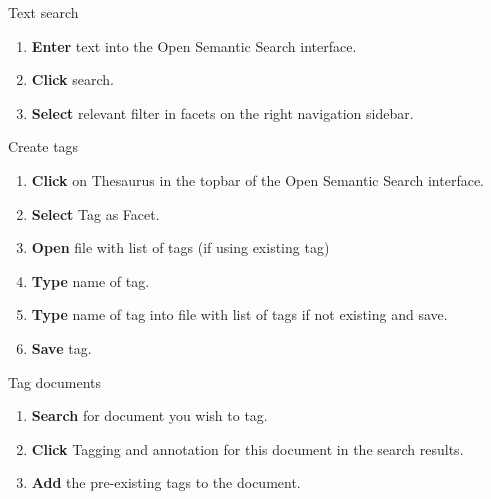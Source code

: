 \documentclass[10pt,a4paper]{article}
\begin{document}
\begin{textbox}{Text search}
 
  

\begin{enumerate}
\item \textbf{Enter} text into the Open Semantic Search interface. 
\item \textbf{Click} search.
\item \textbf{Select} relevant filter in facets on the right navigation sidebar. 
\end{enumerate}

\end{textbox}


\begin{textbox}{Create tags}
 

  

\begin{enumerate}
\item \textbf{Click} on Thesaurus in the topbar of the Open Semantic Search interface.
\item \textbf{Select} Tag as Facet. 
\item \textbf{Open} file with list of tags (if using existing tag)
\item \textbf{Type} name of tag.
\item \textbf{Type} name of tag into file with list of tags if not existing and save.
\item \textbf{Save} tag. 
 
\end{enumerate}

\end{textbox}

\begin{textbox}{Tag documents}

  

\begin{enumerate}
\item \textbf{Search} for document you wish to tag.
\item \textbf{Click} Tagging and annotation for this document in the search results.
\item \textbf{Add} the pre-existing tags to the document. 
\end{enumerate}

\end{textbox}
\end{document}

